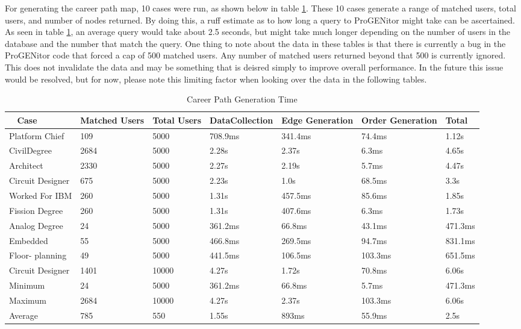 For generating the career path map, 10 cases were run, as shown below in table
\ref{table:career performance}.  These 10 cases generate a range of matched
users, total users, and number of nodes returned.  By doing this, a ruff estimate as to how
long a query to ProGENitor might take can be ascertained.  As seen in table
\ref{table:career performance}, an average query would take about 2.5 seconds,
but might take much longer depending on the number of users in the database and the number that
match the query.  One thing to note about the data in these tables is that there
is currently a bug in the ProGENitor code that forced a cap of 500 matched
users.  Any number of matched users returned beyond that 500 is currently
ignored.  This does not invalidate the data and may be something that is deisred
simply to improve overall performance.  In the future this issue would be
resolved, but for now, please note this limiting factor when looking over the
data in the following tables.

\begin{table}[H]
  \centering
  \begin{tabular}{|p{17mm}|p{16mm}|p{10mm}|p{18mm}|p{19mm}|p{20mm}|p{14mm}|}
  \hline
  \
  Case&Matched Users&Total Users&Data\newline Collection&Edge\newline
  Generation&Order Generation&Total\\
  \hline\hline
  Platform Chief&109&5000&708.9ms&341.4ms&74.4ms&1.12s\\ \hline
  Civil\newline Degree&2684&5000&2.28s&2.37s&6.3ms&4.65s\\ \hline 
  Architect&2330&5000&2.27s&2.19s&5.7ms&4.47s\\ \hline
  Circuit Designer&675&5000&2.23s&1.0s&68.5ms&3.3s\\ \hline
  Worked For IBM&260&5000&1.31s&457.5ms&85.6ms&1.85s\\ \hline
  Fission Degree&260&5000&1.31s&407.6ms&6.3ms&1.73s\\ \hline
  Analog Degree&24&5000&361.2ms&66.8ms&43.1ms&471.3ms\\ \hline
  Embedded&55&5000&466.8ms&269.5ms&94.7ms&831.1ms\\ \hline
  Floor- \newline planning&49&5000&441.5ms&106.5ms&103.3ms&651.5ms\\ \hline
  Circuit Designer&1401&10000&4.27s&1.72s&70.8ms&6.06s\\ \hline
  \hline\hline
  Minimum&24&5000&361.2ms&66.8ms&5.7ms&471.3ms\\ \hline
  Maximum&2684&10000&4.27s&2.37s&103.3ms&6.06s\\ \hline
  Average&785&550&1.55s&893ms&55.9ms&2.5s\\ \hline
  \end{tabular}
  \caption{Career Path Generation Time}
  \label{table:career performance}
\end{table}

